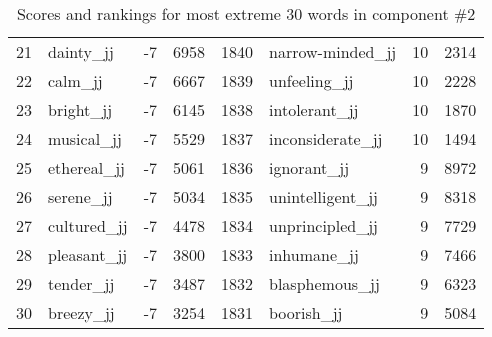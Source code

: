 \begin{table}[tbp]
\begin{tabular}{| rlr@{.}l | rlr@{.}l |}
    21 & dainty\_jj & -7 & 6958    &    1840 & narrow-minded\_jj & 10 & 2314 \\
    22 & calm\_jj & -7 & 6667    &    1839 & unfeeling\_jj & 10 & 2228 \\
    23 & bright\_jj & -7 & 6145    &    1838 & intolerant\_jj & 10 & 1870 \\
    24 & musical\_jj & -7 & 5529    &    1837 & inconsiderate\_jj & 10 & 1494 \\
    25 & ethereal\_jj & -7 & 5061    &    1836 & ignorant\_jj & 9 & 8972 \\
    26 & serene\_jj & -7 & 5034    &    1835 & unintelligent\_jj & 9 & 8318 \\
    27 & cultured\_jj & -7 & 4478    &    1834 & unprincipled\_jj & 9 & 7729 \\
    28 & pleasant\_jj & -7 & 3800    &    1833 & inhumane\_jj & 9 & 7466 \\
    29 & tender\_jj & -7 & 3487    &    1832 & blasphemous\_jj & 9 & 6323 \\
    30 & breezy\_jj & -7 & 3254    &    1831 & boorish\_jj & 9 & 5084 \\
    \hline
    \end{tabular}
    \caption{Scores and rankings for most extreme 30 words in component \#2} 
\end{table}
\clearpage
